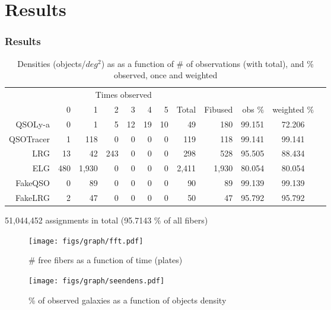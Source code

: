 \documentclass{beamer}
\def\sqd{$deg^{2}$}
\begin{document}
\section{Results}
\begin{frame}\frametitle{Results}
\begin{tiny}
\begin{table}[H]\begin{center}
\begin{tabular}{rrrrrrrrrrcc}
\hline
\multicolumn{6}{r}{Times observed} \\
	~ &           0 &     1 &  2 & 3 & 4 & 5 &  Total & Fibused & obs $\%$ & weighted $\%$ \\ \hline
    QSOLy-a   &     0 &     1 &   5 & 12 & 19 & 10 &    49 &   180 &    99.151 & 72.206 \\ 
  QSOTracer   &     1 &   118 &   0 &  0 &  0 &  0 &   119 &   118 &   99.141 & 99.141 \\ 
        LRG   &    13 &    42 & 243 &  0 &  0 &  0 &   298 &   528 &   95.505 & 88.434 \\ 
        ELG   &   480 & 1,930 &   0 &  0 &  0 &  0 & 2,411 & 1,930 & 80.054 & 80.054 \\ 
    FakeQSO   &     0 &    89 &   0 &  0 &  0 &  0 &    90 &    89 &    99.139 & 99.139 \\ 
    FakeLRG   &     2 &    47 &   0 &  0 &  0 &  0 &    50 &    47 &    95.792 & 95.792 \\ 
\hline
\end{tabular}
\caption{Densities (objects/\sqd) as as a function of \# of observations (with total), and \% observed, once and weighted}\label{res}
\end{center}\end{table}
\end{tiny}
51,044,452 assignments in total (95.7143 \% of all fibers)
\end{frame}


\begin{frame}
	\begin{figure}[H]
		\texttt{[image: figs/graph/fft.pdf]}
		\caption{\# free fibers as a function of time (plates)}\label{fft}
	\end{figure}
\end{frame}


\begin{frame}
\begin{figure}[H]\begin{center}
	\texttt{[image: figs/graph/seendens.pdf]}
	\caption{\% of observed galaxies as a function of objects density}\label{seendens}
\end{center}\end{figure}
\end{frame}
\end{document}
